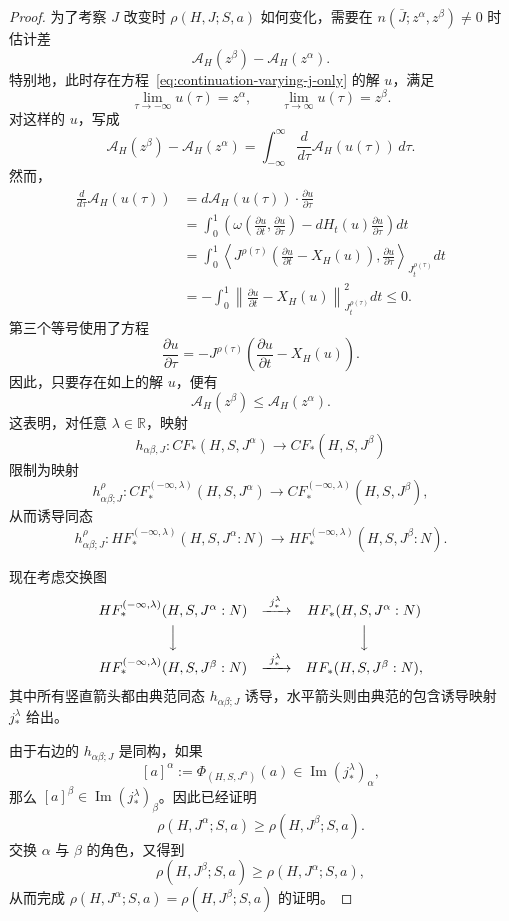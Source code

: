 \begin{proof}
为了考察 $J$ 改变时 $\rho(H,J;S,a)$ 如何变化，需要在 $n(\overline J;z^\alpha,z^\beta)\ne0$ 时估计差
\[
  \mathcal A_H(z^\beta)-\mathcal A_H(z^\alpha).
\]
特别地，此时存在方程~\eqref{eq:continuation-varying-j-only} 的解 $u$，满足
\[
  \lim_{\tau\to-\infty}u(\tau)=z^\alpha,
  \qquad
  \lim_{\tau\to\infty}u(\tau)=z^\beta.
\]
对这样的 $u$，写成
\[
  \mathcal A_H(z^\beta)-\mathcal A_H(z^\alpha)
  =\int_{-\infty}^{\infty}
    \frac d{d\tau}\mathcal A_H(u(\tau))\,d\tau.
\]
然而，
\[
\begin{split}
  \frac d{d\tau}\mathcal A_H(u(\tau))
  &=d\mathcal A_H(u(\tau))\cdot\frac{\partial u}{\partial\tau}\\
  &=\int_0^1\left(
    \omega\left(\frac{\partial u}{\partial t},
                 \frac{\partial u}{\partial\tau}\right)
    -dH_t(u)\frac{\partial u}{\partial\tau}
  \right)dt\\
  &=\int_0^1\left\langle
    J^{\rho(\tau)}\left(
      \frac{\partial u}{\partial t}-X_H(u)
    \right),
    \frac{\partial u}{\partial\tau}
  \right\rangle_{J_t^{\rho(\tau)}}dt\\
  &=-\int_0^1
    \left\lVert\frac{\partial u}{\partial t}-X_H(u)\right\rVert_{J_t^{\rho(\tau)}}^2dt
  \le0.
\end{split}
\]
第三个等号使用了方程
\[
  \frac{\partial u}{\partial\tau}
  =-J^{\rho(\tau)}\left(
    \frac{\partial u}{\partial t}-X_H(u)
  \right).
\]
因此，只要存在如上的解 $u$，便有
\[
  \mathcal A_H(z^\beta)\le\mathcal A_H(z^\alpha).
\]
这表明，对任意 $\lambda\in\mathbb R$，映射
\[
  h_{\alpha\beta,J}:CF_*(H,S,J^\alpha)
  \longrightarrow CF_*(H,S,J^\beta)
\]
限制为映射
\[
  h_{\alpha\beta;J}^{\rho}:
  CF_*^{(-\infty,\lambda)}(H,S,J^\alpha)
  \longrightarrow
  CF_*^{(-\infty,\lambda)}(H,S,J^\beta),
\]
从而诱导同态
\[
  h_{\alpha\beta;J}^{\rho}:
  HF_*^{(-\infty,\lambda)}(H,S,J^\alpha:N)
  \longrightarrow
  HF_*^{(-\infty,\lambda)}(H,S,J^\beta:N).
\]

现在考虑交换图
\[
\begin{array}{ccc}
  HF_*^{(-\infty,\lambda)}(H,S,J^\alpha:N)
  &\xrightarrow{\ j_*^\lambda\ }&
  HF_*(H,S,J^\alpha:N)\\[4pt]
  \Big\downarrow && \Big\downarrow\\[4pt]
  HF_*^{(-\infty,\lambda)}(H,S,J^\beta:N)
  &\xrightarrow{\ j_*^\lambda\ }&
  HF_*(H,S,J^\beta:N),
\end{array}
\]
其中所有竖直箭头都由典范同态 $h_{\alpha\beta;J}$ 诱导，水平箭头则由典范的包含诱导映射 $j_*^\lambda$ 给出。

由于右边的 $h_{\alpha\beta;J}$ 是同构，如果
\[
  [a]^\alpha:=\Phi_{(H,S,J^\alpha)}(a)
  \in\operatorname{Im}(j_*^\lambda)_\alpha,
\]
那么 $[a]^\beta\in\operatorname{Im}(j_*^\lambda)_\beta$。因此已经证明
\[
  \rho(H,J^\alpha;S,a)\ge\rho(H,J^\beta;S,a).
\]
交换 $\alpha$ 与 $\beta$ 的角色，又得到
\[
  \rho(H,J^\beta;S,a)\ge\rho(H,J^\alpha;S,a),
\]
从而完成 $\rho(H,J^\alpha;S,a)=\rho(H,J^\beta;S,a)$ 的证明。
\end{proof}

